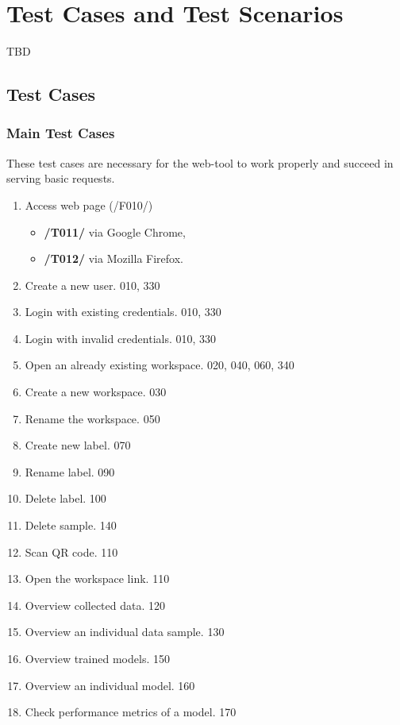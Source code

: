 \section{Test Cases and Test Scenarios}
TBD
\subsection{Test Cases}
\subsubsection{Main Test Cases}
These test cases are necessary for the web-tool to work properly and succeed in serving
basic requests.

\begin{enumerate}[{label = \textbf{/T{\protect\twodigits{\arabic{enumi}}}0/}, leftmargin = *}]
    \item Access web page (/F010/)
    \begin{itemize}
        \item \textbf{/T011/} via Google Chrome,
        \item \textbf{/T012/} via Mozilla Firefox.
    \end{itemize}
    \item Create a new user. 010, 330
    \item Login with existing credentials. 010, 330
    \item Login with invalid credentials. 010, 330
    \item Open an already existing workspace. 020, 040, 060, 340
    \item Create a new workspace. 030
    \item Rename the workspace. 050
    \item Create new label. 070
    \item Rename label. 090
    \item Delete label. 100
    \item Delete sample. 140
    \item Scan QR code. 110
    \item Open the workspace link. 110
    \item Overview collected data. 120
    \item Overview an individual data sample. 130
    \item Overview trained models. 150
    \item Overview an individual model. 160
    \item Check performance metrics of a model. 170

\end{enumerate}
